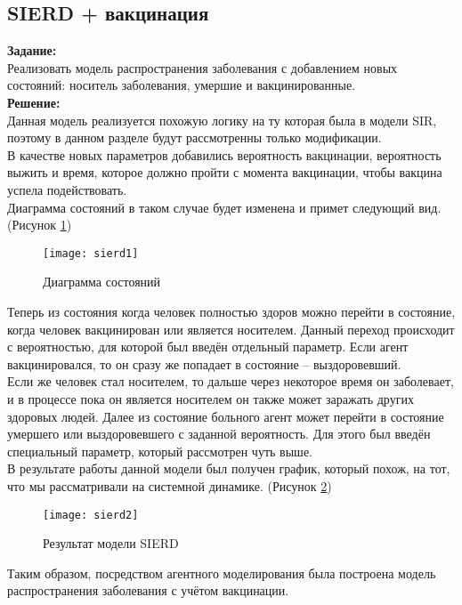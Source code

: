 \subsection*{SIERD + вакцинация}

\textbf{Задание:}\\
Реализовать модель распространения заболевания с добавлением новых состояний: носитель заболевания, умершие и вакцинированные.\\

\textbf{Решение:}\\
Данная модель реализуется похожую логику на ту которая была в модели SIR, поэтому в данном разделе будут рассмотренны только модификации.\\

В качестве новых параметров добавились вероятность вакцинации, вероятность выжить и время, которое должно пройти с момента вакцинации, чтобы вакцина успела подействовать.\\

Диаграмма состояний в таком случае будет изменена и примет следующий вид.  (Рисунок \ref{fig:sierd1})
\begin{figure}[h]
	\centering \texttt{[image: sierd1]}
	\caption{Диаграмма состояний}
	\label{fig:sierd1}
\end{figure}

Теперь из состояния когда человек полностью здоров можно перейти в состояние, когда человек вакцинирован или является носителем. Данный переход происходит с вероятностью, для которой был введён отдельный параметр. Если агент вакцинировался, то он сразу же попадает в состояние -- выздоровевший.\\

Если же человек стал носителем, то дальше через некоторое время он заболевает, и в процессе пока он является носителем он также может заражать других здоровых людей. Далее из состояние больного агент может перейти в состояние умершего или выздоровевшего с заданной вероятность. Для этого был введён специальный параметр, который рассмотрен чуть выше.\\

В результате работы данной модели был получен график, который похож, на тот, что мы рассматривали на системной динамике. (Рисунок \ref{fig:sierd2})
\begin{figure}[h]
	\centering \texttt{[image: sierd2]}
	\caption{Результат модели SIERD}
	\label{fig:sierd2}
\end{figure}

Таким образом, посредством агентного моделирования была построена модель распространения заболевания с учётом вакцинации.